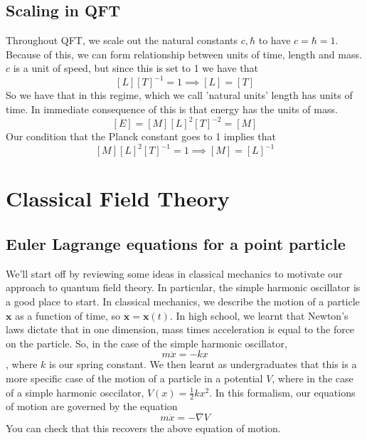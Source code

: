 \documentclass[11pt, oneside]{article}   	%
\theoremstyle{newline}
\theoremstyle{newline}
\theoremstyle{newline}
\theoremstyle{newline}
\theoremstyle{newline}
\begin{document}
\subsection{Scaling in QFT} 
Throughout QFT, we scale out the natural constants $c, \hbar$ to have $c = \hbar = 1$. Because of this, we can form relationship between units of time, length and mass. $c$ is a unit of speed, but since this is set to 1 we have that 
\[ 
[ L ][T]^{-1}  = 1 \implies [L]  = [T] 
\] 
So we have that in this regime, which we call 'natural units' length has units of time. In immediate consequence of this is that energy has the units of mass. 
\[ 
[ E]  = [M] [L]^2 [T]^{-2} = [M] 
\] 
Our condition that the Planck constant goes to 1 implies that \[ 
[ M ][ L]^2 [ T]^{ -1}  = 1 \implies [M ]  = [ L]^{ -1} 
\] 

\pagebreak 
\section{Classical Field Theory} 

\subsection {Euler Lagrange equations for a point particle}  
We'll start off by reviewing some ideas in classical mechanics to motivate our approach to quantum field theory. In particular, the simple harmonic oscillator is a good place to start. In classical mechanics, we describe the motion of a particle $ \mathbf{x}  $ as a function of time, so $\mathbf{x} = \mathbf{x}( t ) $. In high school, we learnt that Newton's laws dictate that in one dimension, mass times acceleration is equal to the force on the particle. So, in the case of the simple harmonic oscillator, \[ m \ddot{x} = - k x \], where $k$ is our spring constant. We then learnt as undergraduates that this is a more specific case of the motion of a particle in a potential $V$, where in the case of a simple harmonic osccilator, $V (x) = \frac{1}{2} k x^2 $. In this formalism, our equations of motion are governed by the equation \[ m \ddot{x} = - \nabla V \] You can check that this recovers the above equation of motion.      
\end{document}
